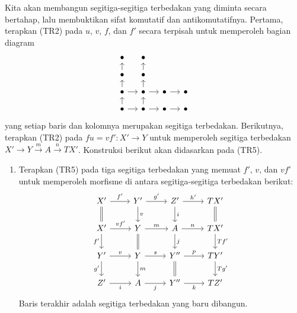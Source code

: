 \begin{bukti}
	Kita akan membangun segitiga-segitiga terbedakan yang diminta secara
	bertahap, lalu membuktikan sifat komutatif dan antikomutatifnya. Pertama,
	terapkan (TR2) pada $u$, $v$, $f$, dan $f'$ secara terpisah untuk memperoleh
	bagian diagram
	\[\begin{tikzcd}[row sep=small, column sep=small]
		\bullet & \bullet & & \\
		\bullet \arrow[u] & \bullet \arrow[u] & & \\
		\bullet \arrow[r] \arrow[u] & \bullet \arrow[r] \arrow[u] & \bullet \arrow[r] & \bullet \\
		\bullet \arrow[r] \arrow[u] & \bullet \arrow[u] \arrow[r] & \bullet \arrow[r] & \bullet
	\end{tikzcd}\]
	yang setiap baris dan kolomnya merupakan segitiga terbedakan. Berikutnya,
	terapkan (TR2) pada $fu = vf' : X' \to Y$ untuk memperoleh segitiga
	terbedakan $X' \to Y \xrightarrow{m} A \xrightarrow{n} TX'$. Konstruksi
	berikut akan didasarkan pada (TR5).

	\begin{enumerate}
		\item Terapkan (TR5) pada tiga segitiga terbedakan yang memuat $f'$,
		$v$, dan $vf'$ untuk memperoleh morfisme di antara segitiga-segitiga
		terbedakan berikut:
		\begin{equation}\label{eqn:triangulated-9-diag-aux-0}\begin{tikzcd}
			X' \arrow[r, "{f'}"] \arrow[equal, d] & Y' \arrow[r, "{g'}"] \arrow[d, "v"] & Z' \arrow[r, "{h'}"] \arrow[d, "i"] & TX' \arrow[equal, d] \\
			X' \arrow[r, "{vf'}"] \arrow[d, "{f'}"'] & Y \arrow[r, "m"] \arrow[equal, d] & A \arrow[r, "n"] \arrow[d, "j"] & TX' \arrow[d, "{Tf'}"] \\
			Y' \arrow[r, "v"] \arrow[d, "{g'}"'] & Y \arrow[r, "s"] \arrow[d, "m"] & Y'' \arrow[r, "p"] \arrow[equal, d] & TY' \arrow[d, "{Tg'}"] \\
			Z' \arrow[r, "i"'] & A \arrow[r, "j"'] & Y'' \arrow[r, "k"'] & TZ'
		\end{tikzcd}\end{equation}
		Baris terakhir adalah segitiga terbedakan yang baru dibangun.


\end{enumerate}
\end{bukti}
